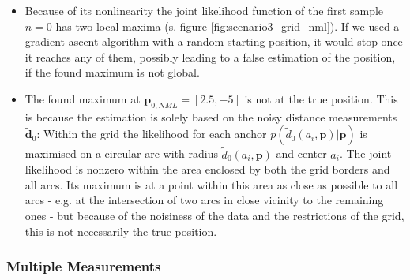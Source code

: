 \documentclass{article}
\begin{document}
\begin{itemize}
\item Because of its nonlinearity the joint likelihood function of the first sample $n=0$ has two local maxima (s. figure \ref{fig:scenario3_grid_nml}). If we used a gradient ascent algorithm with a random starting position, it would stop once it reaches any of them, possibly leading to a false estimation of the position, if the found maximum is not global.\\

\item The found maximum at $\mathbf{p}_{0,NML} = \left[ 2.5, -5 \right]$ is not at the true position. This is because the estimation is solely based on the noisy distance measurements $\mathbf{\tilde{d}}_0$: Within the grid the likelihood for each anchor $p(\tilde{d}_0(a_i,\mathbf{p})|\mathbf{p})$ is maximised on a circular arc with radius $\tilde{d}_0(a_i,\mathbf{p})$  and center $a_i$. The joint likelihood is nonzero within the area enclosed by both the grid borders and all arcs. Its maximum is at a point within this area as close as possible to all arcs - e.g. at the intersection of two arcs in close vicinity to the remaining ones - but because of the noisiness of the data and the restrictions of the grid, this is not necessarily the true position.
\end{itemize}

\subsubsection{Multiple Measurements}
\end{document}

